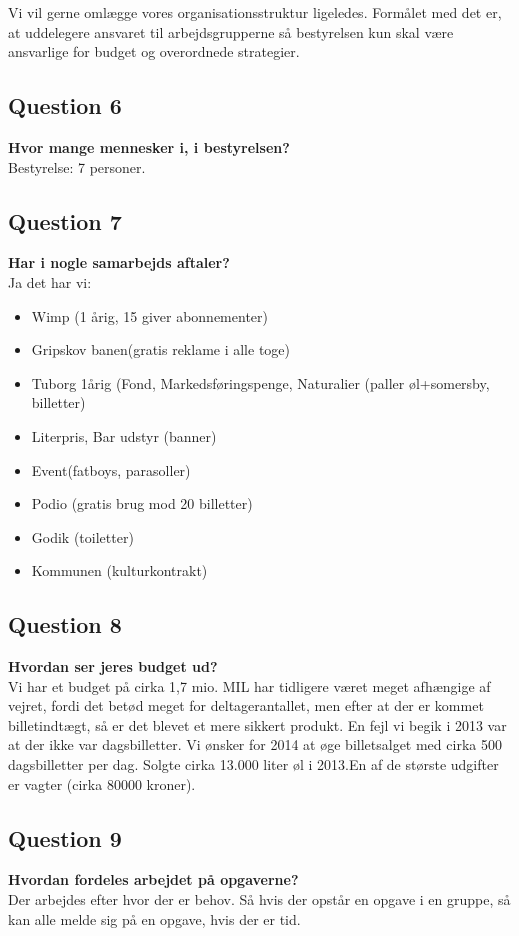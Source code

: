 Vi vil gerne omlægge vores organisationsstruktur ligeledes. Formålet med det er, at uddelegere ansvaret til arbejdsgrupperne så bestyrelsen kun skal være ansvarlige for budget og overordnede strategier. 

\subsection{Question 6}
\label{i1q6}
\noindent \textbf{Hvor mange mennesker i, i bestyrelsen?} \\
Bestyrelse: 7 personer.

\subsection{Question 7}
\label{i1q7}
\noindent \textbf{Har i nogle samarbejds aftaler?} \\
Ja det har vi: 
\begin{itemize}
	\item Wimp (1 årig, 15 giver abonnementer)
	\item Gripskov banen(gratis reklame i alle toge)
	\item Tuborg 1årig (Fond, Markedsføringspenge, Naturalier (paller øl+somersby, billetter)
	\item Literpris, Bar udstyr (banner)
	\item Event(fatboys, parasoller)
	\item Podio (gratis brug mod 20 billetter)
	\item Godik (toiletter)
	\item Kommunen (kulturkontrakt)
\end{itemize}

\subsection{Question 8}
\label{i1q8}
\noindent \textbf{Hvordan ser jeres budget ud?} \\
Vi har et budget på cirka 1,7 mio. MIL har tidligere været meget afhængige af vejret, fordi det betød meget for deltagerantallet, men efter at der er kommet billetindtægt, så er det blevet et mere sikkert produkt. En fejl vi begik i 2013 var at der ikke var dagsbilletter. Vi ønsker for 2014 at øge billetsalget med cirka 500 dagsbilletter per dag. Solgte cirka 13.000 liter øl i 2013.En af de største udgifter er vagter (cirka 80000 kroner).

\subsection{Question 9}
\label{i1q9}
\noindent \textbf{Hvordan fordeles arbejdet på opgaverne?} \\
Der arbejdes efter hvor der er behov. Så hvis der opstår en opgave i en gruppe, så kan alle melde sig på en opgave, hvis der er tid. 


